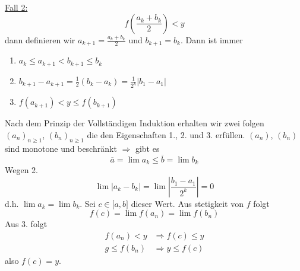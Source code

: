 \begin{beweis}{}
\noindent\underline{Fall 2:}
\[f\left( {\frac{{{a_k} + {b_k}}}{2}} \right) < y\]
dann definieren wir $a_{k+1}=\frac{a_k+b_k}{2}$ und $b_{k+1}=b_k$. Dann ist immer
\begin{enumerate}
\item $a_k\leq a_{k+1}<b_{k+1}\leq b_k$
\item ${b_{k + 1}} - {a_{k + 1}} = \frac{1}{2}\left( {{b_k} - {a_k}} \right) = \frac{1}{{{2^k}}}\left| {{b_1} - {a_1}} \right|$
\item $f\left( a_{k+1}\right) < y \leq f\left( b_{k+1}\right)$
\end{enumerate}
Nach dem Prinzip der Vollständigen Induktion erhalten wir zwei folgen $\left( a_n\right)_{n\geq 1}$, $\left( b_n\right)_{n\geq 1}$ die den Eigenschaften 1., 2. und 3. erfüllen. $\left( a_n\right)$, $\left( b_n\right)$ sind monotone und beschränkt $\Rightarrow$ gibt es 
\[\overline{a}=\lim a_k\leq\overline{b}=\lim b_k \]
Wegen 2.
\[\lim \left| {{a_k} - {b_k}} \right| = \lim \left| {\frac{{{b_1} - {a_1}}}{{{2^k}}}} \right| = 0\]
d.h. $\lim a_k=\lim b_k$. Sei $c\in\lbrack a,b\rbrack$ dieser Wert. Aus stetigkeit von $f$ folgt 
\[f\left( c \right) = \lim f\left( {{a_n}} \right) = \lim f\left( {{b_n}} \right)\]
Aus 3. folgt 
\begin{align*}
f\left( {{a_n}} \right) < y &\Rightarrow f\left( c \right) \le y\\
g \le f\left( {{b_n}} \right) &\Rightarrow y \le f\left( c \right)
\end{align*}
also $f(c)=y$.
\end{beweis}

